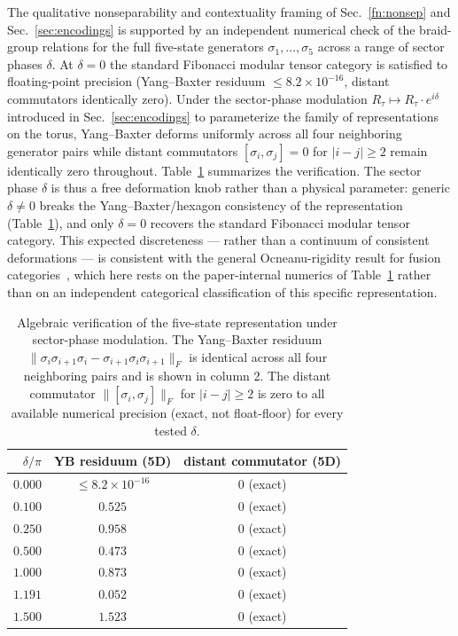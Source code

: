 \documentclass[aps,pra,twocolumn,superscriptaddress,longbibliography,floatfix,nofootinbib]{revtex4-2}
\begin{document}
The qualitative nonseparability and contextuality framing of Sec.~\ref{fn:nonsep} and
Sec.~\ref{sec:encodings} is supported by an independent numerical check
of the braid-group relations for the full five-state generators
$\sigma_1, \ldots, \sigma_5$ across a range of sector phases $\delta$.
At $\delta = 0$ the standard Fibonacci modular tensor category is
satisfied to floating-point precision (Yang--Baxter residuum
$\leq 8.2 \times 10^{-16}$, distant commutators identically zero).
Under the sector-phase modulation
$R_\tau \mapsto R_\tau \cdot e^{i\delta}$ introduced in
Sec.~\ref{sec:encodings} to parameterize the family of
representations on the torus, Yang--Baxter deforms uniformly across
all four neighboring generator pairs while distant commutators
$[\sigma_i, \sigma_j] = 0$ for $|i-j| \geq 2$ remain identically zero
throughout. Table~\ref{tab:yb_under_delta} summarizes the verification.
The sector phase $\delta$ is thus a free deformation knob rather than a
physical parameter: generic $\delta \neq 0$ breaks the Yang--Baxter/hexagon
consistency of the representation (Table~\ref{tab:yb_under_delta}), and only
$\delta = 0$ recovers the standard Fibonacci modular tensor category. This
expected discreteness --- rather than a continuum of consistent deformations
--- is consistent with the general Ocneanu-rigidity result for fusion
categories~\cite{EtingofNikshychOstrik2002}, which here rests on the
paper-internal numerics of Table~\ref{tab:yb_under_delta} rather than on an
independent categorical classification of this specific representation.

\begin{table}[h]
\caption{Algebraic verification of the five-state representation under
sector-phase modulation. The Yang--Baxter residuum
$\|\sigma_i\sigma_{i+1}\sigma_i - \sigma_{i+1}\sigma_i\sigma_{i+1}\|_F$
is identical across all four neighboring pairs and is shown in column 2.
The distant commutator $\|[\sigma_i, \sigma_j]\|_F$ for $|i-j| \geq 2$
is zero to all available numerical precision (exact, not float-floor) for
every tested $\delta$.}
\label{tab:yb_under_delta}
\begin{ruledtabular}
\begin{tabular}{rcc}
$\delta/\pi$ & YB residuum (5D) & distant commutator (5D) \\
\hline
$0.000$ & $\leq 8.2 \times 10^{-16}$ & $0$ (exact) \\
$0.100$ & $0.525$ & $0$ (exact) \\
$0.250$ & $0.958$ & $0$ (exact) \\
$0.500$ & $0.473$ & $0$ (exact) \\
$1.000$ & $0.873$ & $0$ (exact) \\
$1.191$ & $0.052$ & $0$ (exact) \\
$1.500$ & $1.523$ & $0$ (exact) \\
\end{tabular}
\end{ruledtabular}
\end{table}
\end{document}
